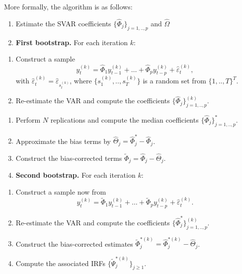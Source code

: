 \documentclass[
  12pt,
]{book}
\providecommand{\tightlist}{%
  \setlength{\itemsep}{0pt}\setlength{\parskip}{0pt}}
\theoremstyle{definition}
\theoremstyle{definition}
\theoremstyle{definition}
\theoremstyle{definition}
\theoremstyle{remark}
\begin{document}
More formally, the algorithm is as follows:

\begin{enumerate}
\def\labelenumi{\arabic{enumi}.}
\tightlist
\item
  Estimate the SVAR coefficients \(\{\widehat{\Phi}_j\}_{j=1,..,p}\) and \(\widehat{\Omega}\)
\item
  \textbf{First bootstrap.} For each iteration \(k\):
\end{enumerate}

\begin{enumerate}
\def\labelenumi{\alph{enumi}.}
\tightlist
\item
  Construct a sample
  \[
  y_t^{(k)}=\widehat{\Phi}_1 y_{t-1}^{(k)} + \dots + \widehat{\Phi}_p y_{t-p}^{(k)} + \hat\varepsilon_t^{(k)},
  \]
  with \(\hat\varepsilon_{t}^{(k)}=\hat\varepsilon_{s_t^{(k)}}\), where \(\{s_1^{(k)},..,s_T^{(k)}\}\) is a random set from \(\{1,..,T\}^T\).
\item
  Re-estimate the VAR and compute the coefficients \(\{\widehat{\Phi}_j\}_{j=1,..,p}^{(k)}\).
\end{enumerate}

\begin{enumerate}
\def\labelenumi{\arabic{enumi}.}
\setcounter{enumi}{2}
\tightlist
\item
  Perform \(N\) replications and compute the median coefficients \(\{\widehat{\Phi}_j\}_{j=1,..,p}^*\).
\item
  Approximate the bias terms by \(\widehat{\Theta}_j=\widehat{\Phi}_j^*-\widehat{\Phi}_j\).
\item
  Construct the bias-corrected terms \(\widetilde{\Phi}_j=\widehat{\Phi}_j-\widehat{\Theta}_j\).
\item
  \textbf{Second bootstrap.} For each iteration \(k\):
\end{enumerate}

\begin{enumerate}
\def\labelenumi{\alph{enumi}.}
\tightlist
\item
  Construct a sample now from
  \[y_t^{(k)}=\widetilde{\Phi}_1 y_{t-1}^{(k)} + \dots + \widetilde{\Phi}_p y_{t-p}^{(k)} + \hat\varepsilon_t^{(k)}.
  \]
\item
  Re-estimate the VAR and compute the coefficients \(\{\widehat{\Phi}^*_j\}_{j=1,..,p}^{(k)}\).
\item
  Construct the bias-corrected estimates \(\widetilde{\Phi}_j^{*(k)}=\widehat{\Phi}_j^{*(k)}-\widehat{\Theta}_j\).
\item
  Compute the associated IRFs \(\{\widetilde{\Psi}_j^{*(k)}\}_{j\ge 1}\).
\end{enumerate}
\end{document}
